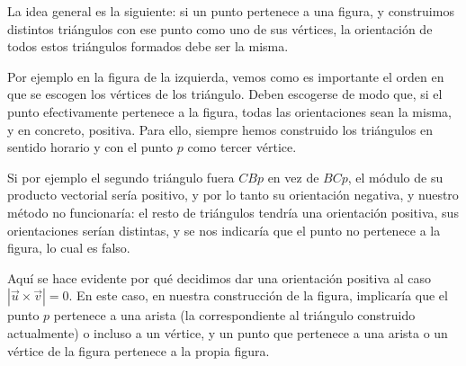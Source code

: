 \begin{minipage}[h]{0.4\columnwidth}
\centering
{}
\end{minipage}
\begin{minipage}[h]{0.6\columnwidth}
La idea general es la siguiente: si un punto pertenece a una figura, y
construimos distintos triángulos con ese punto como uno de sus
vértices, la orientación de todos estos triángulos formados debe ser
la misma.

Por ejemplo en la figura de la izquierda, vemos como es importante el
orden en que se escogen los vértices de los triángulo. Deben escogerse
de modo que, si el punto efectivamente pertenece a la figura, todas
las orientaciones sean la misma, y en concreto, positiva. Para ello,
siempre hemos construido los triángulos en sentido horario y con el
punto $p$ como tercer vértice.
\end{minipage}

 Si por
ejemplo el segundo triángulo fuera $CBp$ en vez de $BCp$, el módulo de
su producto vectorial sería positivo, y por lo tanto su orientación
negativa, y nuestro método no funcionaría: el resto de triángulos
tendría una orientación positiva, sus orientaciones serían distintas,
y se nos indicaría que el punto no pertenece a la figura, lo cual es
falso.

Aquí se hace evidente por qué decidimos dar una orientación positiva
al caso $|\vec{u}\times\vec{v}| = 0$. En este caso, en nuestra
construcción de la figura, implicaría que el punto $p$ pertenece a una
arista (la correspondiente al triángulo construido actualmente) o
incluso a un vértice, y un punto que pertenece a una arista o un
vértice de la figura pertenece a la propia figura.


